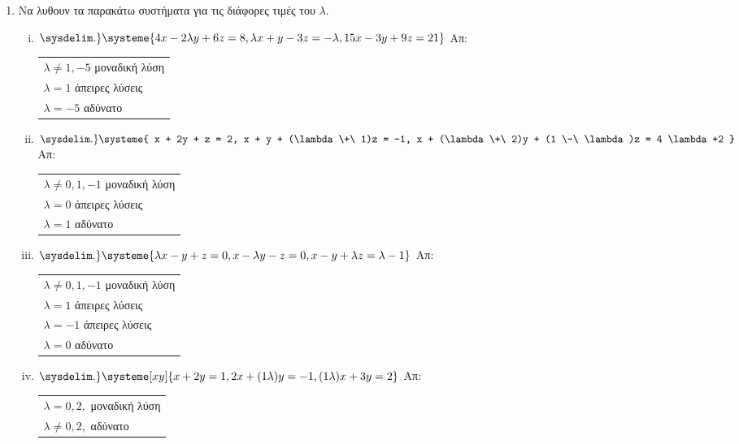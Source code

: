 \begin{enumerate}
\begin{enumerate}[i)]
 \end{enumerate}

\item Να λυθουν τα παρακάτω συστήματα για τις διάφορες τιμές του $ \lambda $.

  \begin{enumerate}[i)]
    \setlength{\itemsep}{\baselineskip}
\item $\sysdelim.\} \systeme{4x-2\lambda y + 6z = 8, \lambda x + y -3z = -\lambda, 15x -3y + 9z = 21}$ \hfill Απ: \begin{tabular}{l}
    $\lambda \neq 1,-5 $ μοναδική λύση \\
    $\lambda = 1 $ άπειρες λύσεις \\
    $\lambda =-5 $ αδύνατο
  \end{tabular}


\item $ \sysdelim.\} \systeme{
  x + 2y + z = 2, 
  x + y + (\lambda  \+\ 1)z = -1, 
  x + (\lambda  \+\ 2)y + (1 \-\ \lambda)z = 4 \lambda +2
} $ \hfill Απ: \begin{tabular}{l}
  $ \lambda \neq 0, 1, -1 $ μοναδική λύση \\
  $ \lambda = 0 $ άπειρες λύσεις \\
  $ \lambda = 1 $ αδύνατο 
\end{tabular} 

\item $ \sysdelim.\} \systeme{
  \lambda x - y + z = 0,
  x - \lambda y - z = 0, 
  x - y + \lambda z = \lambda - 1
} $ \hfill Απ: \begin{tabular}{l}
  $ \lambda \neq 0, 1, -1 $ μοναδική λύση \\
  $ \lambda = 1$ άπειρες λύσεις \\
  $ \lambda = -1 $ άπειρες λύσεις \\
  $ \lambda = 0 $ αδύνατο
\end{tabular} 

\item $ \sysdelim.\} \systeme[xy]{
  x + 2y = 1,
  2x+(1 \- \lambda)y = -1, 
  (1 \- \lambda)x + 3y = 2
} $ \hfill Απ: \begin{tabular}{l}
  $ \lambda = 0, 2, $ μοναδική λύση \\
  $ \lambda \neq 0, 2, $ αδύνατο 
\end{tabular} 

  \end{enumerate}

\end{enumerate}


